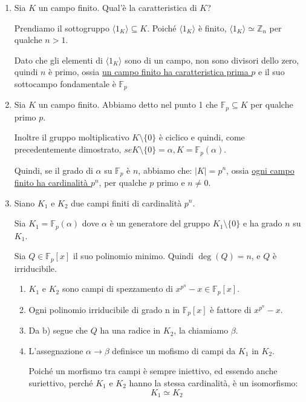 \documentclass[../main.tex]{subfiles}
\begin{document}
\begin{enumerate}
    \item Sia $K$ un campo finito. Qual'è la caratteristica di $K$?

          Prendiamo il sottogruppo $\langle1_K\rangle \subseteq K$. Poiché $\langle1_K\rangle$ è finito, $\langle1_K\rangle \simeq \mathbb{Z}_n$ per qualche $n > 1$.

          Dato che gli elementi di $\langle1_K\rangle$ sono di un campo, non sono divisori dello zero, quindi $n$ è primo, ossia \underline{un campo finito ha caratteristica prima $p$} e il suo sottocampo fondamentale è $\mathbb{F}_p$
    \item Sia $K$ un campo finito. Abbiamo detto nel punto 1 che $\mathbb{F}_p \subseteq K$ per qualche primo $p$.

          Inoltre il gruppo moltiplicativo $K \setminus \{0\}$ è ciclico e quindi, come precedentemente dimostrato, $se K \setminus \{0\} = \alpha, K = \mathbb{F}_p(\alpha)$.

          Quindi, se il grado di $\alpha$ su $\mathbb{F}_p$ è $n$, abbiamo che: $|K| = p^n$, ossia \underline{ogni campo finito ha cardinalità $p^n$}, per qualche $p$ primo e $n \neq 0$.
    \item Siano $K_1$ e $K_2$ due campi finiti di cardinalità $p^n$.

          Sia $K_1 = \mathbb{F}_p(\alpha)$ dove $\alpha$ è un generatore del gruppo $K_1 \setminus \{0\}$ e ha grado $n$ su $K_1$.

          Sia $Q \in \mathbb{F}_p[x]$ il suo polinomio minimo. Quindi $\deg(Q) = n$, e $Q$ è irriducibile.
          \begin{enumerate}[label=\alph*)]
              \item $K_1$ e $K_2$ sono campi di spezzamento di $x^{p^n} - x \in \mathbb{F}_p[x]$.
              \item Ogni polinomio irriducibile di grado n in $\mathbb{F}_p[x]$ è fattore di $x^{p^n} - x$.
              \item Da b) segue che $Q$ ha una radice in $K_2$, la chiamiamo $\beta$.
              \item L'assegnazione $\alpha \rightarrow \beta$ definisce un mofismo di campi da $K_1$ in $K_2$.

                    Poiché un morfismo tra campi è sempre iniettivo, ed essendo anche suriettivo, perché $K_1$ e $K_2$ hanno la stessa cardinalità, è un isomorfismo:
                    \begin{equation*}
                        K_1 \simeq K_2
                    \end{equation*}
          \end{enumerate}
\end{enumerate}
\end{document}

